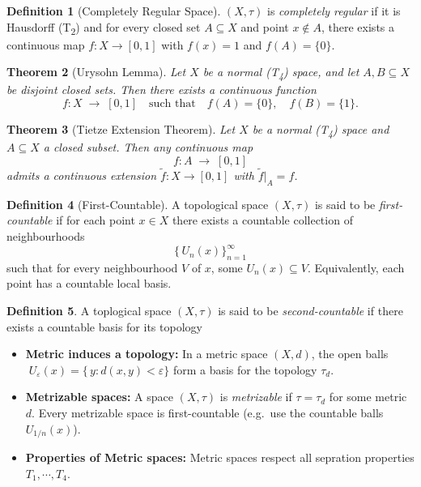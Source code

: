 \documentclass[11pt,a4paper]{article}
\theoremstyle{definition}
\newtheorem{definition}{Definition}[section]
\theoremstyle{plain}
\newtheorem{theorem}[definition]{Theorem}
\theoremstyle{remark}
\begin{document}
\begin{definition}[Completely Regular Space]
\((X,\tau)\) is \emph{completely regular} if it is Hausdorff (T\textsubscript{2}) and for every closed set \(A\subseteq X\) and point \(x\notin A\), there exists a continuous map \(f\colon X\to [0,1]\) with \(f(x)=1\) and \(f(A)=\{0\}\).
\end{definition}

\begin{theorem}[Urysohn Lemma]
Let \(X\) be a normal (T\textsubscript{4}) space, and let \(A,B\subseteq X\) be disjoint closed sets.  Then there exists a continuous function
\[
  f\colon X\;\longrightarrow\;[0,1]
  \quad\text{such that}\quad
  f(A)=\{0\},\quad f(B)=\{1\}.
\]
\end{theorem}

\begin{theorem}[Tietze Extension Theorem]
Let \(X\) be a normal (T\textsubscript{4}) space and \(A\subseteq X\) a closed subset.  Then any continuous map
\[
  f\colon A \;\longrightarrow\;[0,1]
\]
admits a continuous extension
\(\tilde f\colon X\to[0,1]\) with \(\tilde f|_A = f\).
\end{theorem}

\begin{definition}[First-Countable]
A topological space \((X,\tau)\) is said to be \emph{first-countable} if for each point \(x\in X\) there exists a countable collection of neighbourhoods 
\[
  \{\,U_{n}(x)\}_{n=1}^\infty
\]
such that for every neighbourhood \(V\) of \(x\), some \(U_n(x)\subseteq V\).  Equivalently, each point has a countable local basis.
\end{definition}

\begin{definition}
  A toplogical space $(X, \tau)$ is said to be \emph{second-countable} if there exists a countable 
  basis for its topology
\end{definition}

\begin{itemize}
  \item \textbf{Metric induces a topology:}  
    In a metric space \((X,d)\), the open balls 
    \(\;U_\varepsilon(x)=\{\,y:d(x,y)<\varepsilon\}\)
    form a basis for the topology \(\tau_d\).

  \item \textbf{Metrizable spaces:}  
    A space \((X,\tau)\) is \emph{metrizable} if \(\tau=\tau_d\) for some metric \(d\).  
    Every metrizable space is first-countable (e.g.\ use the countable balls \(U_{1/n}(x)\)).

  \item \textbf{Properties of Metric spaces:} Metric spaces respect all sepration properties $T_1, \cdots, T_4$. 
\end{itemize}
\end{document}
